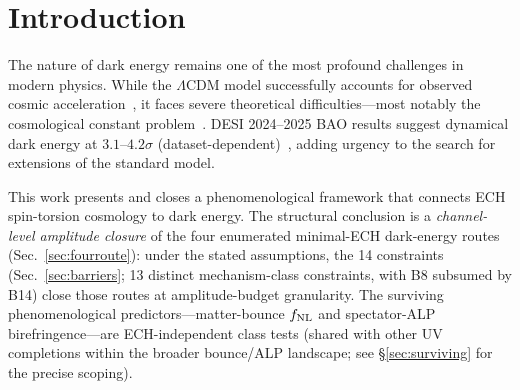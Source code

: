 \documentclass[aps,prd,twocolumn,superscriptaddress,showpacs,preprintnumbers,nofootinbib,longbibliography,floatfix]{revtex4-2}
\newcommand{\fnl}{f_{\rm NL}}
\begin{document}

\maketitle
\tableofcontents


\section{Introduction}\label{sec:intro}

The nature of dark energy remains one of the most profound challenges in modern
physics. While the $\Lambda$CDM model successfully accounts for observed cosmic
acceleration~\cite{Planck2018params}, it faces severe theoretical
difficulties---most notably the cosmological constant problem~\cite{Weinberg1989}.
DESI 2024--2025 BAO results suggest dynamical dark energy at $3.1$--$4.2\sigma$
(dataset-dependent)~\cite{DESI2024,DESI2025DR2}, adding urgency to the search for
extensions of the standard model.

This work presents and closes a phenomenological framework that connects ECH
spin-torsion cosmology to dark energy. The structural conclusion is a
\emph{channel-level amplitude closure} of the four enumerated minimal-ECH
dark-energy routes (Sec.~\ref{sec:fourroute}): under the stated assumptions,
the 14 constraints (Sec.~\ref{sec:barriers}; 13 distinct mechanism-class constraints,
with B8 subsumed by B14) close those routes at amplitude-budget granularity.
The surviving phenomenological predictors---matter-bounce $\fnl$ and
spectator-ALP birefringence---are ECH-independent class tests (shared with
other UV completions within the broader bounce/ALP landscape; see
\S\ref{sec:surviving} for the precise scoping).
\end{document}
